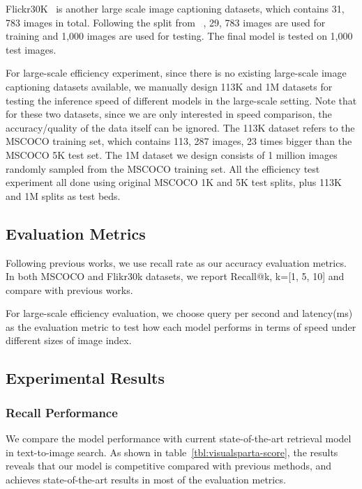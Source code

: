\documentclass[11pt,a4paper]{article}
\begin{document}
Flickr30K~\cite{plummer2015flickr30k} is another large scale image captioning datasets, which contains 31, 783 images in total. Following the split from ~\citet{karpathy2015deep}, 29, 783 images are used for training and 1,000 images are used for testing. The final model is tested on 1,000 test images. 

For large-scale efficiency experiment, since there is no existing large-scale image captioning datasets available, we manually design 113K and 1M datasets for testing the inference speed of different models in the large-scale setting.  Note that for these two datasets, since we are only interested in speed comparison, the accuracy/quality of the data itself can be ignored. The 113K dataset refers to the MSCOCO training set, which contains 113, 287 images, 23 times bigger than the MSCOCO 5K test set.  The 1M dataset we design consists of 1 million images randomly sampled from the MSCOCO training set. All the efficiency test experiment all done using original MSCOCO 1K and 5K test splits, plus 113K and 1M splits as test beds.


\subsection{Evaluation Metrics}
\label{sec:visualsparta-metrics}
Following previous works, we use recall rate as our accuracy evaluation metrics. In both MSCOCO and Flikr30k datasets, we report Recall@k, k=[1, 5, 10] and compare with previous works. 

For large-scale efficiency evaluation, we choose query per second and latency(ms) as the evaluation metric to test how each model performs in terms of speed under different sizes of image index.


\subsection{Experimental Results}

\subsubsection{Recall Performance}
\label{sec:recall-perf}
We compare the model performance with current state-of-the-art retrieval model in text-to-image search. As shown in table~\ref{tbl:visualsparta-score}, the results reveals that our model is competitive compared with previous methods, and achieves state-of-the-art results in most of the evaluation metrics.
\end{document}
